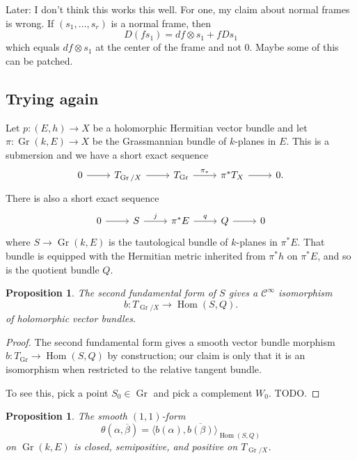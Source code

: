 \documentclass[10pt,a4paper]{article}
\newtheorem{prop}[theo]{Proposition}
\newtheorem*{proof}{Proof}
\newcommand{\cc}[1]{\mathcal{#1}}
\def\ov#1{\overline{#1}}
\DeclareMathOperator{\Gr}{Gr}
\DeclareMathOperator{\Hom}{Hom}
\begin{document}
Later: I don't think this works this well. For one, my claim about normal frames is wrong. If $(s_1,\ldots,s_r)$ is a normal frame, then
\[
D(fs_1) = df \otimes s_1 + f D s_1
\]
which equals $df \otimes s_1$ at the center of the frame and not $0$. Maybe some of this can be patched.


\subsection{Trying again}

Let $p: (E,h) \to X$ be a holomorphic Hermitian vector bundle and let $\pi: \Gr(k,E) \to X$ be the Grassmannian bundle of $k$-planes in $E$. This is a submersion and we have a short exact sequence
\[
\begin{tikzcd}
0 \ar[r] &
T_{\Gr/X} \ar[r] &
T_{\Gr} \ar[r,"\pi_*"] &
\pi^* T_X \ar[r]
& 0.
\end{tikzcd}
\]
There is also a short exact sequence
\begin{equation}
\label{eq:grassmannian}
\begin{tikzcd}
0 \ar[r] &
S \ar[r,"j"] &
\pi^*E \ar[r,"q"] &
Q \ar[r]
& 0
\end{tikzcd}
\end{equation}
where $S \to \Gr(k,E)$ is the tautological bundle of $k$-planes in $\pi^*E$. That bundle is equipped with the Hermitian metric inherited from $\pi^*h$ on $\pi^*E$, and so is the quotient bundle $Q$.

\begin{prop}
The second fundamental form of $S$ gives a $\cc C^\infty$ isomorphism
\[
b : T_{\Gr/X} \longrightarrow \Hom(S,Q).
\]
of holomorphic vector bundles.
\end{prop}

\begin{proof}
The second fundamental form gives a smooth vector bundle morphism $b : T_{\Gr} \to \Hom(S,Q)$ by construction; our claim is only that it is an isomorphism when restricted to the relative tangent bundle.

To see this, pick a point $S_0 \in \Gr$ and pick a complement $W_0$. TODO.
\end{proof}


\begin{prop}
The smooth $(1,1)$-form
\[
\theta(\alpha, \ov\beta)
= \langle b(\alpha), \ov{b(\beta)} \rangle_{\Hom(S,Q)}
\]
on $\Gr(k,E)$ is closed, semipositive, and  positive on $T_{\Gr/X}$.
\end{prop}
\end{document}
